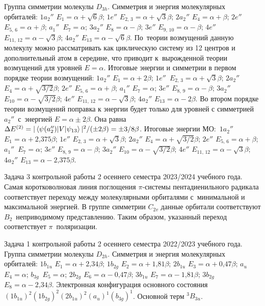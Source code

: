  Группа симметрии молекулы $D_{3h}$. Симметрия и энергия молекулярных орбиталей: $1a_{2}''$ $E_1=\alpha+\sqrt6\beta$; $1e''$ $E_{2,\,3}=\alpha+\sqrt3 \beta$; $2a_{2}''$ $E_4=\alpha+\beta$; $2e''$ $E_{5,\,6}=\alpha+\beta$; $a_{1}''$~$E_7=\alpha$; $3a_{2}''$ $E_8=\alpha-\beta$; $3e''$ $E_{9,\,10}=\alpha-\beta$; $4e''$ $E_{11,\,12}=\alpha-\sqrt3 \beta$; $4a_{2}''$ $E_{13}=\alpha-\sqrt6 \beta$. По~теории возмущений данную молекулу можно рассматривать как циклическую систему из 12 центров и дополнительный атом в середине, что приводит к~вырожденной теории возмущений для уровней $E=\alpha$. Итоговые энергии и симметрии в первом порядке теории возмущений: $1a_{2}''$ $E_1=\alpha+2\beta$; $1e''$~$E_{2,\,3}=\alpha+\sqrt3 \beta$; $2a_{2}''$ $E_4=\alpha+\sqrt{3/2} \beta$; $2e''$ $E_{5,\,6}=\alpha+\beta$; $a_{1}''$ $E_7=\alpha$; $3e''$ $E_{8,\,9}=\alpha-\beta$; $3a_{2}''$ $E_{10}=\alpha-\sqrt{3/2} \beta$; $4e''$ $E_{11,\,12}=\alpha-\sqrt3 \beta$; $4a_{2}''$ $E_{13}=\alpha-2 \beta$. Во втором порядке теории возмущений поправка к энергии будет только для уровней с симметрией $a_2''$~с~энергией $E = \alpha \pm 2\beta$. Она равна $\Delta E^{(2)}= |\braket{\psi(a_2'')|V|\psi_{13}}|^2/(\pm 2\beta) = \pm 3/8 \beta$. Итоговые энергии МО:~$1a_{2}''$ $E_1=\alpha+2\text{,}375\beta$; $1e''$ $E_{2,\,3}=\alpha+\sqrt3 \beta$; $2a_{2}''$ $E_4=\alpha+\sqrt{3/2} \beta$; $2e''$ $E_{5,\,6}=\alpha+\beta$; $a_{1}''$~$E_7=\alpha$; $3e''$ $E_{8,\,9}=\alpha-\beta$; $3a_{2}''$ $E_{10}=\alpha-\sqrt{3/2} \beta$; $4e''$ $E_{11,\,12}=\alpha-\sqrt3 \beta$; $4a_{2}''$ $E_{13}=\alpha-2\text{,}375 \beta$.\par
{} Задача 3 контрольной работы 2 осеннего семестра 2023/2024 учебного года. Самая коротковолновая линия поглощения $\pi$-системы пентадиенильного радикала соответствует переходу между молекулярными орбиталями с~минимальной и максимальной энергией. В группе симметрии $C_{2v}$ данные орбитали соответствуют $B_2$~неприводимому представлению. Таким образом, указанный переход соответствует $\pi$~поляризации.\par
{} Задача 1 контрольной работы 2 осеннего семестра 2022/2023 учебного года. Группа симметрии молекулы $D_{2h}$. Симметрия и энергия молекулярных орбиталей: $1b_{1u}$ $E_1=\alpha+2\text{,}34\beta$; $1b_{2g}$ $E_2=\alpha+1\text{,}81\beta$; $2b_{1u}$ $E_3=\alpha+0\text{,}47\beta$; $a_{u}$ $E_4=\alpha$; $b_{3g}$~$E_5=\alpha$; $2b_{2g}$ $E_6=\alpha-0\text{,}47\beta$; $3b_{1u}$ $E_7=\alpha-1\text{,}81\beta$; $3b_{2g}$ $E_8=\alpha-2\text{,}34\beta$. Электронная конфигурация основного состояния $(1b_{1u})^2 (1b_{2g})^2 (2b_{1u})^2 (a_u)^1 (b_{3g})^1$. Основной терм $^3B_{3u}$.\par
